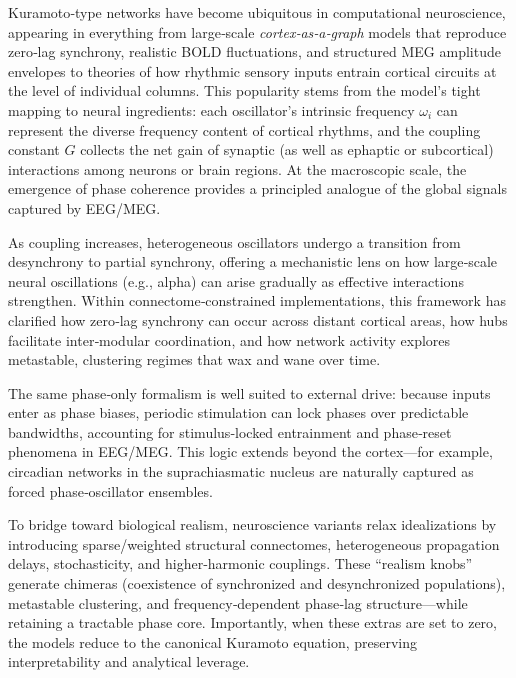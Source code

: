 \documentclass[12pt]{article}
\numberwithin{equation}{section}
\begin{document}
Kuramoto‑type networks have become ubiquitous in computational neuroscience, appearing in everything from large‑scale \textit{cortex‑as‑a‑graph} models that reproduce zero‑lag synchrony, realistic BOLD fluctuations, and structured MEG amplitude envelopes\cite{Breakspear2010,cabral_role_2011,Cabral2014MEGDelays,Cabral2014} to theories of how rhythmic sensory inputs entrain cortical circuits at the level of individual columns\cite{Buzsaki2006}. This popularity stems from the model’s tight mapping to neural ingredients: each oscillator’s intrinsic frequency $\omega_i$ can represent the diverse frequency content of cortical rhythms, and the coupling constant $G$ collects the net gain of synaptic (as well as ephaptic or subcortical) interactions among neurons or brain regions. At the macroscopic scale, the emergence of phase coherence provides a principled analogue of the global signals captured by EEG/MEG\cite{Breakspear2010,Cabral2011}.

As coupling increases, heterogeneous oscillators undergo a transition from desynchrony to partial synchrony\cite{Kuramoto1975,Acebron2005}, offering a mechanistic lens on how large‑scale neural oscillations (e.g., alpha) can arise gradually as effective interactions strengthen. Within connectome‑constrained implementations, this framework has clarified how zero‑lag synchrony can occur across distant cortical areas, how hubs facilitate inter‑modular coordination, and how network activity explores metastable, clustering regimes that wax and wane over time\cite{Schmidt2015KuramotoHubs,Shanahan2010Chimera,Hizanidis2016SciRep,Cabral2014PNB}.

The same phase‑only formalism is well suited to external drive: because inputs enter as phase biases, periodic stimulation can lock phases over predictable bandwidths, accounting for stimulus‑locked entrainment and phase‑reset phenomena in EEG/MEG\cite{Buzsaki2006}. This logic extends beyond the cortex—for example, circadian networks in the suprachiasmatic nucleus are naturally captured as forced phase‑oscillator ensembles\cite{Gu2012SCN}.

To bridge toward biological realism, neuroscience variants relax idealizations by introducing sparse/weighted structural connectomes, heterogeneous propagation delays, stochasticity, and higher‑harmonic couplings. These “realism knobs” generate chimeras (coexistence of synchronized and desynchronized populations), metastable clustering, and frequency‑dependent phase‑lag structure—while retaining a tractable phase core\cite{Shanahan2010Chimera,Hizanidis2016SciRep,Petkoski2016PRE,Petkoski2018PhaseLags,Petkoski2019PhilTransA}. Importantly, when these extras are set to zero, the models reduce to the canonical Kuramoto equation, preserving interpretability and analytical leverage.
\end{document}
